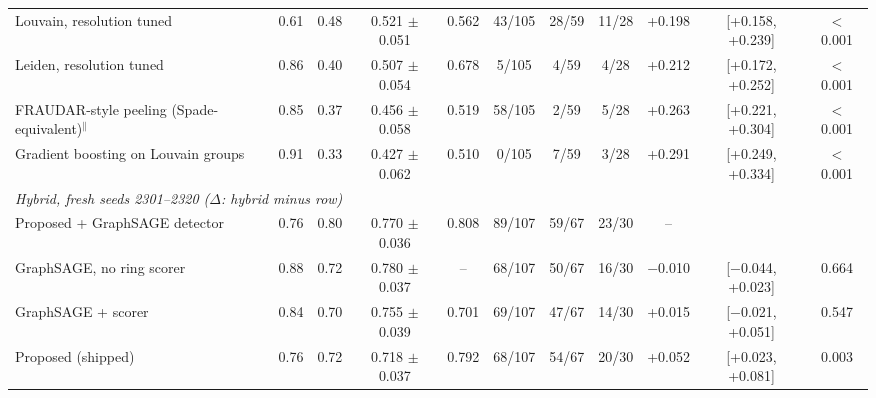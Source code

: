 \begin{table}[t]
{\begin{tabular}{lcccccccccc}
Louvain, resolution tuned & 0.61 & 0.48 & 0.521 $\pm$ 0.051 & 0.562 & 43/105 & 28/59 & 11/28 & +0.198 & [+0.158, +0.239] & $<$0.001 \\
Leiden, resolution tuned & 0.86 & 0.40 & 0.507 $\pm$ 0.054 & 0.678 & 5/105 & 4/59 & 4/28 & +0.212 & [+0.172, +0.252] & $<$0.001 \\
FRAUDAR-style peeling (Spade-equivalent)$^\|$ & 0.85 & 0.37 & 0.456 $\pm$ 0.058 & 0.519 & 58/105 & 2/59 & 5/28 & +0.263 & [+0.221, +0.304] & $<$0.001 \\
Gradient boosting on Louvain groups & 0.91 & 0.33 & 0.427 $\pm$ 0.062 & 0.510 & 0/105 & 7/59 & 3/28 & +0.291 & [+0.249, +0.334] & $<$0.001 \\
\midrule
\multicolumn{11}{l}{\textit{Hybrid, fresh seeds 2301--2320 ($\Delta$: hybrid minus row)}} \\
Proposed + GraphSAGE detector & 0.76 & 0.80 & 0.770 $\pm$ 0.036 & 0.808 & 89/107 & 59/67 & 23/30 & -- &  &  \\
GraphSAGE, no ring scorer & 0.88 & 0.72 & 0.780 $\pm$ 0.037 & -- & 68/107 & 50/67 & 16/30 & $-$0.010 & [$-$0.044, +0.023] & 0.664 \\
GraphSAGE + scorer & 0.84 & 0.70 & 0.755 $\pm$ 0.039 & 0.701 & 69/107 & 47/67 & 14/30 & +0.015 & [$-$0.021, +0.051] & 0.547 \\
Proposed (shipped) & 0.76 & 0.72 & 0.718 $\pm$ 0.037 & 0.792 & 68/107 & 54/67 & 20/30 & +0.052 & [+0.023, +0.081] & 0.003 \\
\bottomrule
\end{tabular}}
\end{table}
